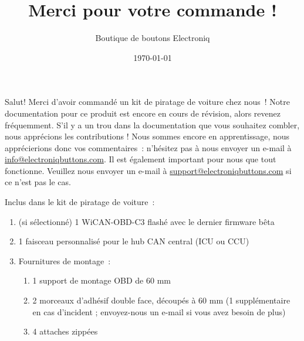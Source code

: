 \documentclass[superscriptaddress,onecolumn,floatfix]{revtex4-2}
\makeatletter
\DeclareRobustCommand{\selectlanguage}[1]{%
    \@ifundefined{alias@\string#1}
      {\ORIGselectlanguage{#1}}
      {\begingroup\edef\x{\endgroup
         \noexpand\ORIGselectlanguage{\@nameuse{alias@#1}}}\x}%
}
\makeatother
\begin{document}
\selectlanguage{fr}

\title{Merci pour votre commande !}
\author{Boutique de boutons Electroniq}
\date{\today}

\maketitle

Salut! Merci d'avoir commandé un kit de piratage de voiture chez nous ! Notre documentation pour ce produit est encore en cours de révision, alors revenez fréquemment. S'il y a un trou dans la documentation que vous souhaitez combler, nous apprécions les contributions ! Nous sommes encore en apprentissage, nous apprécierions donc vos commentaires : n'hésitez pas à nous envoyer un e-mail à \href{mailto:info@electroniqbuttons.com}{info@electroniqbuttons.com}. Il est également important pour nous que tout fonctionne. Veuillez nous envoyer un e-mail à \href{mailto:support@electroniqbuttons.com}{support@electroniqbuttons.com} si ce n'est pas le cas. 

Inclus dans le kit de piratage de voiture :
{\small
\begin{enumerate}
  \item (si sélectionné) 1 WiCAN-OBD-C3 flashé avec le dernier firmware bêta
  \item 1 faisceau personnalisé pour le hub CAN central (ICU ou CCU)
  \item Fournitures de montage : 
    \begin{enumerate}
      \item 1 support de montage OBD de 60 mm
      \item 2 morceaux d'adhésif double face, découpés à 60 mm (1 supplémentaire en cas d'incident ; envoyez-nous un e-mail si vous avez besoin de plus)
      \item 4 attaches zippées
    \end{enumerate}
\end{enumerate}
}
\end{document}
